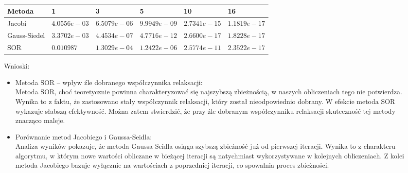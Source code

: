 \begin{center}
\begin{tabular}{|l|l|l|l|l|l|}
\hline
Metoda       & 1          & 3          & 5          & 10         & 16         \\ \hline
Jacobi       & $4.0556e-03$ & $6.5079e-06$ & $9.9949e-09$ & $2.7341e-15$ & $1.1819e-17$ \\ \hline
Gauss-Siedel & $3.3702e-03$ & $4.4534e-07$ & $4.7716e-12$ & $2.6600e-17$ & $1.8228e-17$ \\ \hline
SOR          & $0.010987$   & $1.3029e-04$ & $1.2422e-06$ & $2.5774e-11$ & $2.3522e-17$ \\ \hline
\end{tabular}
\end{center}
Wnioski:
\begin{itemize}
    \item Metoda SOR – wpływ źle dobranego współczynnika relaksacji:\\
    Metoda SOR, choć teoretycznie powinna charakteryzować się najszybszą zbieżnością, w naszych obliczeniach tego nie potwierdza. Wynika to z faktu, że zastosowano stały współczynnik relaksacji, który został nieodpowiednio dobrany. W efekcie metoda SOR wykazuje słabszą efektywność. Można zatem stwierdzić, że przy źle dobranym współczynniku relaksacji skuteczność tej metody znacząco maleje.
    \item Porównanie metod Jacobiego i Gaussa-Seidla:\\
    Analiza wyników pokazuje, że metoda Gaussa-Seidla osiąga szybszą zbieżność już od pierwszej iteracji. Wynika to z charakteru algorytmu, w którym nowe wartości obliczane w bieżącej iteracji są natychmiast wykorzystywane w kolejnych obliczeniach. Z kolei metoda Jacobiego bazuje wyłącznie na wartościach z poprzedniej iteracji, co spowalnia proces zbieżności.
\end{itemize}



